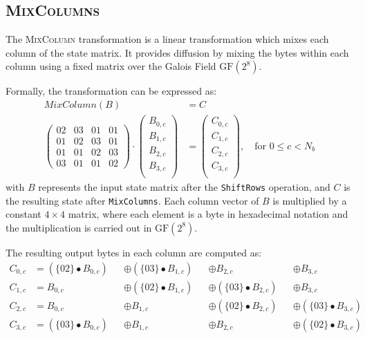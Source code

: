 \subsection{\textsc{MixColumns}}

The \textsc{MixColumn} transformation is a linear transformation which mixes each column of the state matrix. 
It provides diffusion by mixing the bytes within each column using a fixed matrix over the Galois Field $\text{GF}(2^8)$.

Formally, the transformation can be expressed as:
\begin{align}
    MixColumn(B) &= C\\
    \begin{pmatrix}
        02 & 03 & 01 & 01\\
        01 & 02 & 03 & 01\\
        01 & 01 & 02 & 03\\
        03 & 01 & 01 & 02
    \end{pmatrix}
    \cdot
    \begin{pmatrix}
        B_{0,c} \\
        B_{1,c} \\
        B_{2,c} \\
        B_{3,c} \\
    \end{pmatrix}
    &=
    \begin{pmatrix}
        C_{0,c} \\
        C_{1,c} \\
        C_{2,c} \\
        C_{3,c} \\
    \end{pmatrix}, \quad \text{for } 0 \leq c < N_b
\end{align}
with $B$ represents the input state matrix after the \texttt{ShiftRows} operation, and $C$ is the resulting state after \texttt{MixColumns}. 
Each column vector of $B$ is multiplied by a constant $4 \times 4$ matrix, where each element is a byte in hexadecimal notation and the multiplication is carried out in $\text{GF}(2^8)$.

The resulting output bytes in each column are computed as:
\begin{align}
    C_{0,c} & = (\{02\} \bullet B_{0,c}) &&\oplus (\{03\} \bullet B_{1,c}) &&\oplus B_{2,c} &&\oplus B_{3,c}\\
    C_{1,c} & = B_{0,c} &&\oplus (\{02\} \bullet B_{1,c}) &&\oplus (\{03\} \bullet B_{2,c}) &&\oplus B_{3,c}\\
    C_{2,c} & = B_{0,c}  &&\oplus B_{1,c} &&\oplus (\{02\} \bullet B_{2,c}) &&\oplus (\{03\} \bullet B_{3,c})\\
    C_{3,c} & = (\{03\} \bullet B_{0,c}) &&\oplus B_{1,c} &&\oplus B_{2,c} &&\oplus (\{02\} \bullet B_{3,c})
\end{align}
